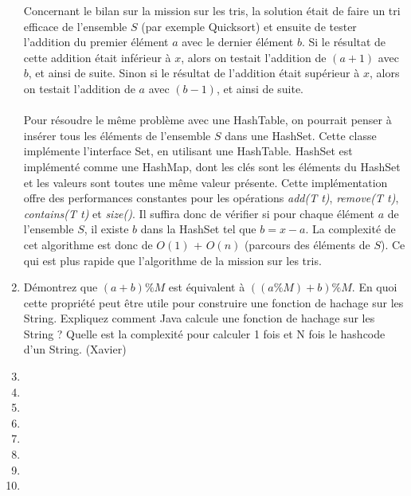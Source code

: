 \documentclass[11pt]{article}
\begin{document}
\begin{enumerate}
Concernant le bilan sur la mission sur les tris, la solution était de faire un tri efficace de l'ensemble $S$ (par exemple Quicksort) et ensuite de tester l'addition du premier élément $a$ avec le dernier élément $b$. Si le résultat de cette addition était inférieur à $x$, alors on testait l'addition de $(a+1)$ avec $b$, et ainsi de suite. Sinon si le résultat de l'addition était supérieur à $x$, alors on testait l'addition de $a$ avec $(b-1)$, et ainsi de suite.\\\\
Pour résoudre le même problème avec une HashTable, on pourrait penser à insérer tous les éléments de l'ensemble $S$ dans une HashSet. Cette classe implémente l'interface Set, en utilisant une HashTable. HashSet est implémenté comme une HashMap, dont les clés sont les éléments du HashSet et les valeurs sont toutes une même valeur présente. Cette implémentation offre des performances constantes pour les opérations \textit{add(T t)}, \textit{remove(T t)}, \textit{contains(T t)} et \textit{size()}. Il suffira donc de vérifier si pour chaque élément $a$ de l'ensemble $S$, il existe $b$ dans la HashSet tel que $b = x - a$. La complexité de cet algorithme est donc de $O(1)$ + $O(n)$ (parcours des éléments de $S$). Ce qui est plus rapide que l'algorithme de la mission sur les tris.\\

\item Démontrez que $(a + b)\%M$ est équivalent à $((a\%M) + b)\%M$. En quoi cette 
propriété peut être utile pour construire une fonction de hachage sur les String.
Expliquez comment Java calcule une fonction de hachage sur les String ? Quelle
est la complexité pour calculer 1 fois et N fois le hashcode d’un String. (Xavier)
\item
\item 
\item 
\item
\item 
\item 
\item
\item 


\end{enumerate}
\end{document}
